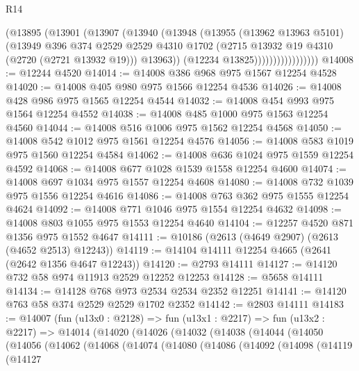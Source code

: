 \begin{lexlean}{R14}
\begin{coremodule}
                          (@13895
                            (@13901
                              (@13907
                                (@13940
                                  (@13948
                                    (@13955
                                      (@13962 @13963 @5101)
                                      (@13949
                                        @396
                                        @374
                                        @2529
                                        @2529
                                        @4310
                                        @1702
                                        (@2715 @13932 @19 @4310 (@2720 (@2721 @13932 @19)))
                                        @13963))
                                    (@12234 @13825)))))))))))))))))
@14008 := @12244 @4520
@14014 := @14008 @386 @968 @975 @1567 @12254 @4528
@14020 := @14008 @405 @980 @975 @1566 @12254 @4536
@14026 := @14008 @428 @986 @975 @1565 @12254 @4544
@14032 := @14008 @454 @993 @975 @1564 @12254 @4552
@14038 := @14008 @485 @1000 @975 @1563 @12254 @4560
@14044 := @14008 @516 @1006 @975 @1562 @12254 @4568
@14050 := @14008 @542 @1012 @975 @1561 @12254 @4576
@14056 := @14008 @583 @1019 @975 @1560 @12254 @4584
@14062 := @14008 @636 @1024 @975 @1559 @12254 @4592
@14068 := @14008 @677 @1028 @1539 @1558 @12254 @4600
@14074 := @14008 @697 @1034 @975 @1557 @12254 @4608
@14080 := @14008 @732 @1039 @975 @1556 @12254 @4616
@14086 := @14008 @763 @362 @975 @1555 @12254 @4624
@14092 := @14008 @771 @1046 @975 @1554 @12254 @4632
@14098 := @14008 @803 @1055 @975 @1553 @12254 @4640
@14104 := @12257 @4520 @871 @1356 @975 @1552 @4647
@14111 := @10186 (@2613 (@4649 @2907) (@2613 (@4652 @2513) @12243))
@14119 := @14104 @14111 @12254 @4665 (@2641 (@2642 @1356 @4647 @12243))
@14120 := @2793 @14111
@14127 := @14120 @732 @58 @974 @11913 @2529 @12252 @12253
@14128 := @5658 @14111
@14134 := @14128 @768 @973 @2534 @2534 @2352 @12251
@14141 := @14120 @763 @58 @374 @2529 @2529 @1702 @2352
@14142 := @2803 @14111
@14183 := @14007
    (fun (u13x0 : @2128) =>
    fun (u13x1 : @2217) =>
    fun (u13x2 : @2217) =>
    @14014
      (@14020
        (@14026
          (@14032
            (@14038
              (@14044
                (@14050
                  (@14056
                    (@14062
                      (@14068
                        (@14074
                          (@14080
                            (@14086
                              (@14092
                                (@14098
                                  (@14119
                                    (@14127

\end{coremodule}
\end{lexlean}
